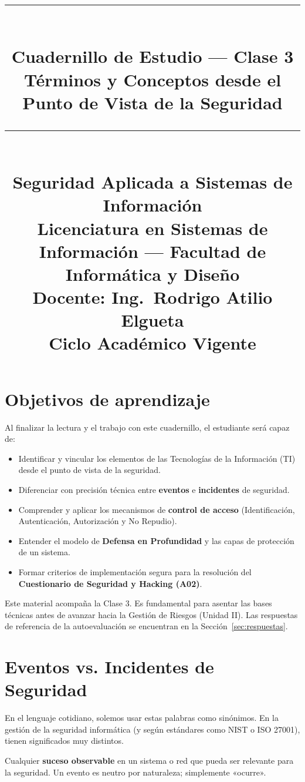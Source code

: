 \documentclass[11pt,a4paper]{article}
\title{%
  \rule{\textwidth}{1pt}\\[0.4cm]
  \textbf{\Large Cuadernillo de Estudio --- Clase 3}\\[0.2cm]
  \large Términos y Conceptos desde el Punto de Vista de la Seguridad\\[0.2cm]
  \rule{\textwidth}{1pt}\\[0.4cm]
  \normalsize Seguridad Aplicada a Sistemas de Información\\
  Licenciatura en Sistemas de Información --- Facultad de Informática y Diseño\\
  Docente: Ing.\ Rodrigo Atilio Elgueta\\[0.2cm]
  \small Ciclo Académico Vigente
}
\author{}
\date{}
\begin{document}
\maketitle
\thispagestyle{fancy}
\tableofcontents
\newpage

\section{Objetivos de aprendizaje}
Al finalizar la lectura y el trabajo con este cuadernillo, el estudiante será capaz de:

\begin{itemize}[leftmargin=*]
  \item Identificar y vincular los elementos de las Tecnologías de la Información (TI) desde el punto de vista de la seguridad.
  \item Diferenciar con precisión técnica entre \textbf{eventos} e \textbf{incidentes} de seguridad.
  \item Comprender y aplicar los mecanismos de \textbf{control de acceso} (Identificación, Autenticación, Autorización y No Repudio).
  \item Entender el modelo de \textbf{Defensa en Profundidad} y las capas de protección de un sistema.
  \item Formar criterios de implementación segura para la resolución del \textbf{Cuestionario de Seguridad y Hacking (A02)}.
\end{itemize}

\begin{clave}
Este material acompaña la Clase 3. Es fundamental para asentar las bases técnicas antes de avanzar hacia la Gestión de Riesgos (Unidad II). Las respuestas de referencia de la autoevaluación se encuentran en la Sección~\ref{sec:respuestas}.
\end{clave}

\section{Eventos vs. Incidentes de Seguridad}
En el lenguaje cotidiano, solemos usar estas palabras como sinónimos. En la gestión de la seguridad informática (y según estándares como NIST o ISO 27001), tienen significados muy distintos.

\begin{definicion}
Cualquier \textbf{suceso observable} en un sistema o red que pueda ser relevante para la seguridad. Un evento es neutro por naturaleza; simplemente «ocurre».
\end{definicion}
\end{document}
